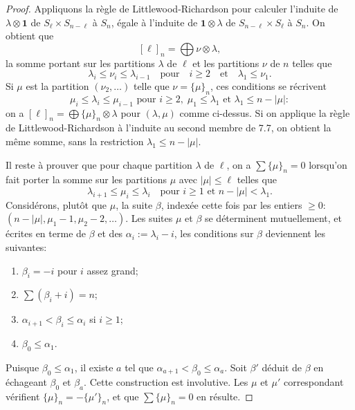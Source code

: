 \documentclass[11pt,a4paper]{article}
\theoremstyle{plain}
\theoremstyle{definition}
\begin{document}
\begin{proof}
Appliquons la r\`egle de Littlewood-Richardson pour calculer l'induite de $\lambda \otimes \mathbf{1}$ de $S_\ell \times S_{n-\ell}$ \`a $S_n$, \'egale \`a l'induite de $\mathbf{1} \otimes \lambda$ de $S_{n-\ell} \times S_\ell$ \`a $S_n$. On obtient que
\[
[\ell]_n = \bigoplus \nu \otimes \lambda,
\]
la somme portant sur les partitions $\lambda$ de $\ell$ et les partitions $\nu$ de $n$ telles que
\[
\lambda_i \leq \nu_i \leq \lambda_{i-1} \quad \text{pour} \quad i \geq 2 \quad \text{et} \quad \lambda_1 \leq \nu_1.
\]
Si $\mu$ est la partition $(\nu_2, \ldots)$ telle que $\nu = \{\mu\}_n$, ces conditions se r\'ecrivent
\[
\mu_i \leq \lambda_i \leq \mu_{i-1} \text{ pour } i \geq 2, \; \mu_1 \leq \lambda_1 \text{ et } \lambda_1 \leq n - |\mu|:
\]
on a $[\ell]_n = \bigoplus \{\mu\}_n \otimes \lambda$ pour $(\lambda, \mu)$ comme ci-dessus. Si on applique la r\`egle de Littlewood-Richardson \`a l'induite au second membre de 7.7, on obtient la m\^eme somme, sans la restriction $\lambda_1 \leq n - |\mu|$.

Il reste \`a prouver que pour chaque partition $\lambda$ de $\ell$, on a $\sum \{\mu\}_n = 0$ lorsqu'on fait porter la somme sur les partitions $\mu$ avec $|\mu| \leq \ell$ telles que
\[
\lambda_{i+1} \leq \mu_i \leq \lambda_i \quad \text{pour } i \geq 1 \text{ et } n - |\mu| < \lambda_1.
\]
Consid\'erons, plut\^ot que $\mu$, la suite $\beta$, index\'ee cette fois par les entiers $\geq 0$: $(n - |\mu|, \mu_1 - 1, \mu_2 - 2, \ldots)$. Les suites $\mu$ et $\beta$ se d\'eterminent mutuellement, et \'ecrites en terme de $\beta$ et des $\alpha_i := \lambda_i - i$, les conditions sur $\beta$ deviennent les suivantes:
\begin{enumerate}[label=\alph*.]
\item $\beta_i = -i$ pour $i$ assez grand;
\item $\sum (\beta_i + i) = n$;
\item $\alpha_{i+1} < \beta_i \leq \alpha_i$ si $i \geq 1$;
\item $\beta_0 \leq \alpha_1$.
\end{enumerate}

Puisque $\beta_0 \leq \alpha_1$, il existe $a$ tel que $\alpha_{a+1} < \beta_0 \leq \alpha_a$. Soit $\beta'$ d\'eduit de $\beta$ en \'echageant $\beta_0$ et $\beta_a$. Cette construction est involutive. Les $\mu$ et $\mu'$ correspondant v\'erifient $\{\mu\}_n = -\{\mu'\}_n$, et que $\sum \{\mu\}_n = 0$ en r\'esulte.
\end{proof}
\end{document}
